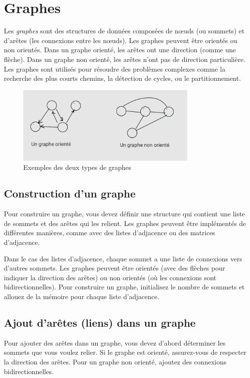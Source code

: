 \section{Graphes}

Les \emph{graphes} sont des structures de données composées de nœuds (ou sommets) et d'arêtes (les connexions entre les nœuds). Les graphes peuvent être orientés ou non orientés. Dans un graphe orienté, les arêtes ont une direction (comme une flèche). Dans un graphe non orienté, les arêtes n'ont pas de direction particulière. Les graphes sont utilisés pour résoudre des problèmes complexes comme la recherche des plus courts chemins, la détection de cycles, ou le partitionnement.

\begin{figure}[H]
	\centering
	 \includegraphics[width=0.8\textwidth]{image/graph}  %
	\caption{Exemples des deux types de graphes}
\end{figure}

\subsection{Construction d'un graphe}
Pour construire un graphe, vous devez définir une structure qui contient une liste de sommets et des arêtes qui les relient. Les graphes peuvent être implémentés de différentes manières, comme avec des listes d'adjacence ou des matrices d'adjacence.

Dans le cas des listes d'adjacence, chaque sommet a une liste de connexions vers d'autres sommets. Les graphes peuvent être orientés (avec des flèches pour indiquer la direction des arêtes) ou non orientés (où les connexions sont bidirectionnelles). Pour construire un graphe, initialisez le nombre de sommets et allouez de la mémoire pour chaque liste d'adjacence.

\subsection{Ajout d'arêtes (liens) dans un graphe}
Pour ajouter des arêtes dans un graphe, vous devez d'abord déterminer les sommets que vous voulez relier. Si le graphe est orienté, assurez-vous de respecter la direction des arêtes. Pour un graphe non orienté, ajoutez des connexions bidirectionnelles. 

